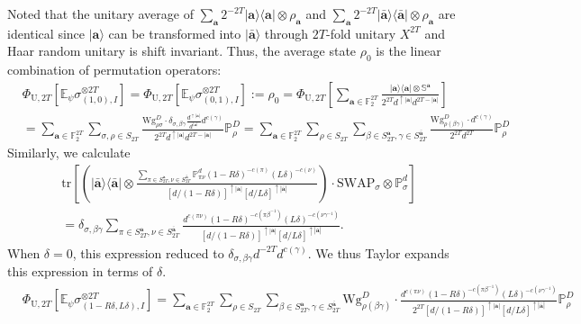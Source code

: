 \documentclass[aps,%
twocolumn,%
floatfix,%
pra,%
amsfonts,%
groupedaddress,%
superscriptaddress]{revtex4-2}%
\newcommand{\bra}[1]{\langle #1\rvert}
\newcommand{\ket}[1]{\lvert #1\rangle}
\newcommand{\1}{\mathbbm{1}}
\begin{document}
Noted that the unitary average of $\sum_{\mathbf{a}}2^{-2T}\ket{{\mathbf{a}}}\!\bra{{\mathbf{a}}} \otimes \rho_{\mathbf{a}}$ and $\sum_{\mathbf{a}}2^{-2T}\ket{\bar{\mathbf{a}}}\!\bra{\bar{\mathbf{a}}}\otimes \rho_{\mathbf{a}}$ are identical since $\ket{\mathbf{a}}$ can be transformed into $\ket{\bar{\mathbf{a}}}$ through $2T$-fold unitary $X^{2T}$ and Haar random unitary is shift invariant. 
Thus, the average state $\rho_0$ is the linear combination of permutation operators:
\begin{align}
    &\Phi_{\mathrm{U},2T}\left[ \mathbb{E}_{\psi}\sigma_{(1,0),I}^{\otimes 2T} \right] = \Phi_{\mathrm{U},2T}\left[ \mathbb{E}_{\psi}\sigma_{(0,1),I}^{\otimes 2T} \right] :=\rho_0 =  \Phi_{\mathrm{U},2T}\left[ \sum_{\mathbf{a} \in \mathbb{F}_2^{2T}}\frac{ \ket{{\mathbf{a}}}\!\bra{{\mathbf{a}}}\otimes\mathbb{S}^{\mathbf{a}}}{2^{2T}d^{\uparrow |\mathbf{a}|} d^{2T - |\mathbf{a}|}}\right]\\
    & = \sum_{\mathbf{a} \in \mathbb{F}_2^{2T}}\sum_{\sigma,\rho \in S_{2T}}\frac{\mathrm{Wg}_{\rho \sigma}^{D}\cdot \delta_{\sigma,\beta\gamma}\frac{d^{\uparrow |\mathbf{a}|}}{d^{|{\mathbf{a}}|}}d^{c(\gamma)}}{2^{2T}d^{\uparrow |\mathbf{a}|} d^{2T - |\mathbf{a}|}} \mathbb{P}_{\rho}^{D} 
    =\sum_{\mathbf{a} \in \mathbb{F}_2^{2T}}\sum_{\rho \in S_{2T}}\sum_{\beta \in S_{2T}^{{\mathbf{a}}},\gamma\in S_{2T}^{\bar{\mathbf{a}}}}\frac{\mathrm{Wg}_{\rho(\beta\gamma)}^{D}\cdot d^{c(\gamma)}}{2^{2T} d^{2T}} \mathbb{P}_{\rho}^{D} 
\end{align}
Similarly, we calculate 
\begin{align}
    &\mathrm{tr}\left[\left(\ket{\bar{\mathbf{a}}}\!\bra{\bar{\mathbf{a}}}\otimes \frac{\sum_{\pi \in S_{2T}^{\mathbf{a}}, \nu \in S_{2T}^{\bar{\mathbf{a}}}} \mathbb{P}_{\pi \nu}^{d} (1 - R \delta)^{-c(\pi)} (L\delta)^{-c(\nu)}}{[d/(1 - R\delta)]^{\uparrow |\mathbf{a}|} [d/L\delta]^{\uparrow |\bar{\mathbf{a}}|}}\right)\cdot \mathrm{SWAP}_{\sigma} \otimes \mathbb{P}_{\sigma}^{d}\right]\\
    &= \delta_{\sigma, \beta\gamma}\sum_{\pi \in S_{2T}^{\mathbf{a}}, \nu \in S_{2T}^{\bar{\mathbf{a}}}}\frac{ d^{c(\pi \nu)} (1 - R \delta)^{-c(\pi \beta^{-1})} (L\delta)^{-c(\nu\gamma^{-1})}}{[d/(1 - R\delta)]^{\uparrow |\mathbf{a}|} [d/L\delta]^{\uparrow |\bar{\mathbf{a}}|}}.
\end{align}
When $\delta = 0$, this expression reduced to $\delta_{\sigma,\beta\gamma}d^{-2T} d^{c(\gamma)}$. We thus Taylor expands this expression in terms of $\delta$. 
\begin{align}
    &\Phi_{\mathrm{U},2T}\left[ \mathbb{E}_{\psi}\sigma_{(1-R\delta,L\delta),I}^{\otimes 2T} \right]  = \sum_{\mathbf{a} \in \mathbb{F}_2^{2T}}\sum_{\rho \in S_{2T}}\sum_{\beta \in S_{2T}^{{\mathbf{a}}},\gamma\in S_{2T}^{\bar{\mathbf{a}}}}\mathrm{Wg}_{\rho(\beta\gamma)}^{D}\cdot \frac{ d^{c(\pi \nu)} (1 - R \delta)^{-c(\pi \beta^{-1})} (L\delta)^{-c(\nu\gamma^{-1})}}{2^{2T}[d/(1 - R\delta)]^{\uparrow |\mathbf{a}|} [d/L\delta]^{\uparrow |\bar{\mathbf{a}}|}} \mathbb{P}_{\rho}^{D} 
\end{align}
\end{document}
